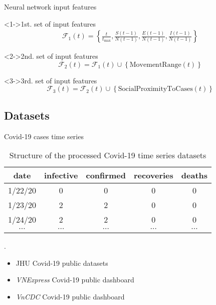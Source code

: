 \begin{frame}{Neural network input features}
    \begin{block}<1->{1st. set of input features}
        \begin{equation*}
            \begin{aligned}
                \mathcal{F}_1(t) = \left\lbrace \frac{t}{t_\text{max}}, \frac{S(t-1)}{N(t-1)}, \frac{E(t-1)}{N(t-1)}, \frac{I(t-1)}{N(t-1)} \right\rbrace
            \end{aligned}
        \end{equation*}
    \end{block}

    \begin{block}<2->{2nd. set of input features}
        \begin{equation*}
            \mathcal{F}_2(t) = \mathcal{F}_1(t) \cup \left\lbrace \text{MovementRange}(t) \right\rbrace
        \end{equation*}
    \end{block}

    \begin{block}<3->{3rd. set of input features}
        \begin{equation*}
            \mathcal{F}_3(t) = \mathcal{F}_2(t) \cup \left\lbrace \text{SocialProximityToCases}(t) \right\rbrace
        \end{equation*}
    \end{block}
\end{frame}

\subsection{Datasets}

\begin{frame}{Covid-19 cases time series}
    \begin{table}[h]
    \centering
    \begin{tabular}{| c | c | c | c | c |}
        date & infective & confirmed & recoveries & deaths \\
        \hline\hline
        1/22/20 & 0 & 0 & 0 & 0 \\
        \hline
        1/23/20 & 2 & 2 & 0 & 0 \\
        \hline
        1/24/20 & 2 & 2 & 0 & 0 \\
        \hline
        $\cdots$ & $\cdots$ & $\cdots$ & $\cdots$ & $\cdots$ \\
    \end{tabular}
    \caption{Structure of the processed Covid-19 time series datasets}.
    \label{tab:country-covid-timeseries}
    \end{table}

    \begin{itemize}
        \item \gls{JHU} Covid-19 public datasets
        \item \textit{VNExpress} Covid-19 public dashboard
        \item \textit{VnCDC} Covid-19 public dashboard
    \end{itemize}
\end{frame}

